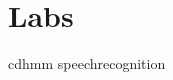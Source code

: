\documentclass[nociteref]{SIAM-GH-book}
\begin{document}
\part{Labs}
%
%
%
%
%
%
{cdhmm}
{speechrecognition}
%
%
%
%
\end{document}
